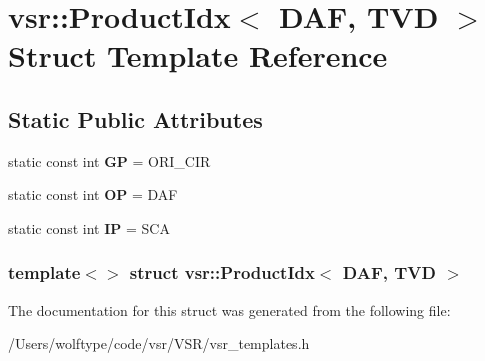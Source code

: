 \hypertarget{structvsr_1_1_product_idx_3_01_d_a_f_00_01_t_v_d_01_4}{\section{vsr\-:\-:Product\-Idx$<$ D\-A\-F, T\-V\-D $>$ Struct Template Reference}
\label{structvsr_1_1_product_idx_3_01_d_a_f_00_01_t_v_d_01_4}
}
\subsection*{Static Public Attributes}
\begin{DoxyCompactItemize}
\item 
\hypertarget{structvsr_1_1_product_idx_3_01_d_a_f_00_01_t_v_d_01_4_a81cc7bf4a0033f250698a01cf3a367af}{static const int {\bfseries G\-P} = O\-R\-I\-\_\-\-C\-I\-R}\label{structvsr_1_1_product_idx_3_01_d_a_f_00_01_t_v_d_01_4_a81cc7bf4a0033f250698a01cf3a367af}

\item 
\hypertarget{structvsr_1_1_product_idx_3_01_d_a_f_00_01_t_v_d_01_4_a6ba98b1442659b495ef63f3c3815b606}{static const int {\bfseries O\-P} = D\-A\-F}\label{structvsr_1_1_product_idx_3_01_d_a_f_00_01_t_v_d_01_4_a6ba98b1442659b495ef63f3c3815b606}

\item 
\hypertarget{structvsr_1_1_product_idx_3_01_d_a_f_00_01_t_v_d_01_4_af01e3a310f3f32f68db7d9cca5e58b1b}{static const int {\bfseries I\-P} = S\-C\-A}\label{structvsr_1_1_product_idx_3_01_d_a_f_00_01_t_v_d_01_4_af01e3a310f3f32f68db7d9cca5e58b1b}

\end{DoxyCompactItemize}
\subsubsection*{template$<$$>$ struct vsr\-::\-Product\-Idx$<$ D\-A\-F, T\-V\-D $>$}



The documentation for this struct was generated from the following file\-:\begin{DoxyCompactItemize}
\item 
/\-Users/wolftype/code/vsr/\-V\-S\-R/vsr\-\_\-templates.\-h\end{DoxyCompactItemize}

